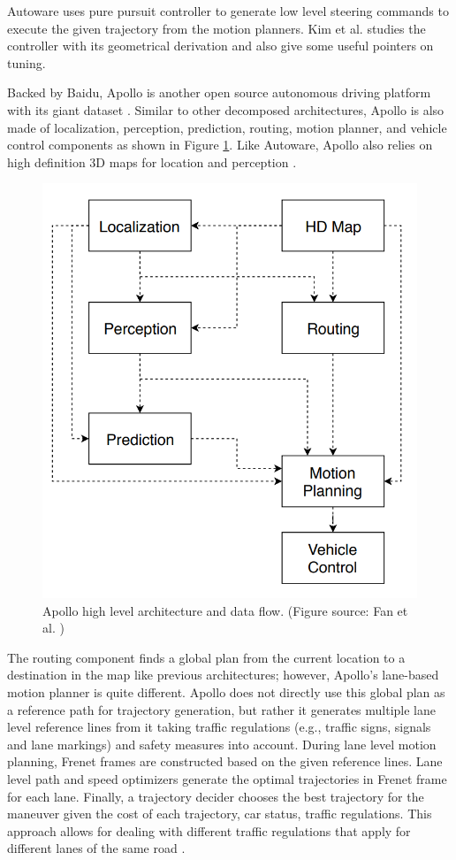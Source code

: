 Autoware uses pure pursuit controller to generate low level steering commands
to execute the given trajectory from the motion planners. Kim et al.
\cite{Kim2013SensorbasedMP} studies the controller with its geometrical
derivation and also give some useful pointers on tuning.

Backed by Baidu, Apollo is another open source autonomous driving platform with
its giant dataset \cite{Huang2018TheAD}. Similar to other decomposed
architectures, Apollo is also made of localization, perception, prediction,
routing, motion planner, and vehicle control components as shown in Figure
\ref{figure:apollo}. Like Autoware, Apollo also relies on high definition 3D
maps for location and perception \cite{Fan2018BaiduAE}.

\begin{figure}[h]
  \centering
  \includegraphics[width=.8\textwidth]{figures/apollo.png}
  \caption[Apollo high level architecture]{Apollo high level architecture and
    data flow. (Figure source: Fan et al. \cite{Fan2018BaiduAE})}
  \label{figure:apollo}
\end{figure}

The routing component finds a global plan from the current location
to a destination in the map like previous architectures; however, Apollo's
lane-based motion planner is quite different. Apollo does not directly use
this global plan as a reference path for trajectory generation, but rather it
generates multiple lane level reference lines from it taking traffic
regulations (e.g., traffic signs, signals and lane markings) and safety
measures into account. During lane level motion planning, Frenet frames are
constructed based on the given reference lines. Lane level path and speed
optimizers generate the optimal trajectories in Frenet frame for each lane.
Finally, a trajectory decider chooses the best trajectory for the maneuver
given the cost of each trajectory, car status, traffic regulations. This
approach allows for dealing with different traffic regulations that apply for
different lanes of the same road \cite{Fan2018BaiduAE}.

